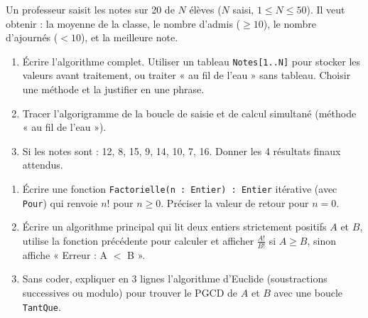 \documentclass[11pt]{article}
\begin{document}
\begin{exercice}
Un professeur saisit les notes sur 20 de $N$ élèves ($N$ saisi, $1 \le N \le 50$). Il veut obtenir : la moyenne de la classe, le nombre d'admis ($\ge 10$), le nombre d'ajournés ($< 10$), et la meilleure note.
\begin{enumerate}
    \item Écrire l'algorithme complet. Utiliser un tableau \texttt{Notes[1..N]} pour stocker les valeurs avant traitement, ou traiter « au fil de l'eau » sans tableau. Choisir une méthode et la justifier en une phrase.
    \item Tracer l'algorigramme de la boucle de saisie et de calcul simultané (méthode « au fil de l'eau »).
    \item Si les notes sont : 12, 8, 15, 9, 14, 10, 7, 16. Donner les 4 résultats finaux attendus.
\end{enumerate}
\end{exercice}

\begin{exercice}
\begin{enumerate}
    \item Écrire une fonction \texttt{Factorielle(n : Entier) : Entier} itérative (avec \texttt{Pour}) qui renvoie $n!$ pour $n \ge 0$. Préciser la valeur de retour pour $n=0$.
    \item Écrire un algorithme principal qui lit deux entiers strictement positifs $A$ et $B$, utilise la fonction précédente pour calculer et afficher $\frac{A!}{B!}$ si $A \ge B$, sinon affiche « Erreur : A $<$ B ».
    \item Sans coder, expliquer en 3 lignes l'algorithme d'Euclide (soustractions successives ou modulo) pour trouver le PGCD de $A$ et $B$ avec une boucle \texttt{TantQue}.
\end{enumerate}
\end{exercice}
\end{document}
